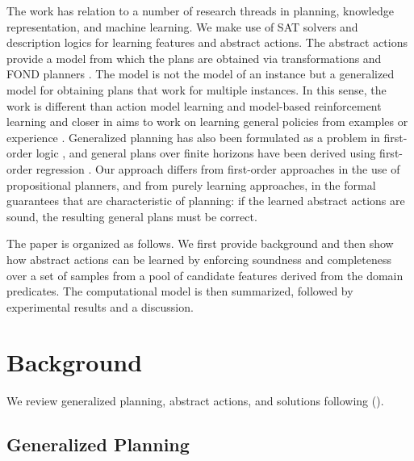 \documentclass[letterpaper]{article} %
\newcommand{\citeay}[1]{\citeauthor{#1} (\citeyear{#1})}
\begin{document}
The work has relation to a number of research threads in planning, knowledge
representation, and machine learning. We make use of SAT solvers and description
logics for learning features and abstract actions. %
The abstract actions provide a model from which the plans are obtained via
transformations and FOND planners \cite{geffner:book,ghallab:book}.
The model is not the model of an instance but a generalized model for obtaining
plans that work for multiple instances. In this sense, the work is different than
action model learning \cite{yang:action-learning} and model-based reinforcement
learning and closer in aims to work on learning general policies from examples or
experience \cite{martin-geffner:generalized,fern:bias,mazebase,general-drl}.
Generalized planning has also been formulated as a problem in first-order logic
\cite{srivastava:generalized}, and general plans over finite horizons have been
derived using first-order regression \cite{boutilier2001symbolic,wang2008first,van2012solving,sanner:practicalMDPs}.
Our approach differs from first-order approaches in the use of propositional
planners, and from purely learning approaches, in the formal guarantees that
are characteristic of planning: if the learned abstract actions are  sound,
the resulting general plans must be correct. 

The paper is organized as follows. We first provide background and then show 
how abstract actions can be learned by enforcing soundness and
completeness over a set of samples from a pool of candidate features derived
from the domain predicates. The computational model is then summarized,
followed by experimental results and a discussion.


\section{Background}

We review generalized planning, abstract actions, and solutions following  \citeay{bonet:ijcai2018}.


\subsection{Generalized Planning}
\end{document}
